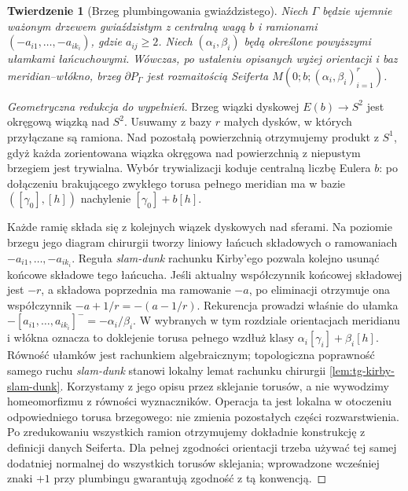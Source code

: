\documentclass[11pt,a4paper]{report}
\numberwithin{equation}{section}
\theoremstyle{plain}
\newtheorem{twierdzenie}{Twierdzenie}[section]
\theoremstyle{definition}
\theoremstyle{remark}
\begin{document}
\begin{twierdzenie}[Brzeg plumbingowania gwiaździstego]
\label{thm:tg-star-seifert}
Niech $\Gamma$ będzie ujemnie ważonym drzewem
gwiaździstym z centralną wagą $b$ i ramionami
$(-a_{i1},\ldots,-a_{ik_i})$, gdzie $a_{ij}\ge2$.
Niech $(\alpha_i,\beta_i)$ będą określone powyższymi
ułamkami łańcuchowymi. Wówczas, po ustaleniu opisanych
wyżej orientacji i baz meridian--włókno, brzeg
$\partial P_\Gamma$ jest rozmaitością Seiferta
$M(0;b;(\alpha_i,\beta_i)_{i=1}^r)$.
\end{twierdzenie}
\begin{proof}[Geometryczna redukcja do wypełnień]
Brzeg wiązki dyskowej $E(b)\to S^2$ jest okręgową
wiązką nad $S^2$. Usuwamy z bazy $r$ małych dysków,
w których przyłączane są ramiona. Nad pozostałą
powierzchnią otrzymujemy produkt z $S^1$, gdyż
każda zorientowana wiązka okręgowa nad powierzchnią
z niepustym brzegiem jest trywialna. Wybór
trywializacji koduje centralną liczbę Eulera $b$:
po dołączeniu brakującego zwykłego torusa pełnego
meridian ma w bazie $([\gamma_0],[h])$ nachylenie
$[\gamma_0]+b[h]$.

Każde ramię składa się z kolejnych wiązek dyskowych
nad sferami. Na poziomie brzegu jego diagram chirurgii
tworzy liniowy łańcuch składowych o ramowaniach
$-a_{i1},\ldots,-a_{ik_i}$. Reguła \emph{slam-dunk}
rachunku Kirby'ego pozwala kolejno usunąć końcowe
składowe tego łańcucha. Jeśli aktualny współczynnik
końcowej składowej jest $-r$, a składowa poprzednia
ma ramowanie $-a$, po eliminacji otrzymuje ona
współczynnik $-a+1/r=-(a-1/r)$. Rekurencja prowadzi
właśnie do ułamka
$-[a_{i1},\ldots,a_{ik_i}]^-=-\alpha_i/\beta_i$.
W wybranych w tym rozdziale orientacjach meridianu
i włókna oznacza to doklejenie torusa pełnego
wzdłuż klasy $\alpha_i[\gamma_i]+\beta_i[h]$.
Równość ułamków jest rachunkiem algebraicznym;
topologiczna poprawność samego ruchu \emph{slam-dunk}
stanowi lokalny lemat rachunku chirurgii
\ref{lem:tg-kirby-slam-dunk}. Korzystamy z jego opisu
przez sklejanie torusów,
a nie wywodzimy homeomorfizmu z równości wyznaczników.
Operacja ta jest lokalna w otoczeniu odpowiedniego
torusa brzegowego: nie zmienia pozostałych części
rozwarstwienia. Po zredukowaniu wszystkich ramion
otrzymujemy dokładnie konstrukcję z definicji danych
Seiferta. Dla pełnej zgodności orientacji trzeba używać
tej samej dodatniej normalnej do wszystkich torusów
sklejania; wprowadzone wcześniej znaki $+1$ przy
plumbingu gwarantują zgodność z tą konwencją.
\end{proof}
\end{document}

